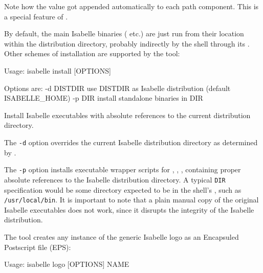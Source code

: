 \begin{isabellebody}
\begin{isamarkuptext}
  Note how the \hyperlink{setting.ML-IDENTIFIER}{\mbox{}} value got appended
  automatically to each path component. This is a special feature of
  \hyperlink{setting.ISABELLE-OUTPUT}{\mbox{}}.%
\end{isamarkuptext}%
\isamarkuptrue%
%
\isamarkuptrue%
%
\begin{isamarkuptext}%
By default, the main Isabelle binaries (\hyperlink{executable.isabelle}{\mbox{}} etc.)  are just run from their location within the
  distribution directory, probably indirectly by the shell through its
  \hyperlink{setting.PATH}{\mbox{}}.  Other schemes of installation are supported by the
  \hypertarget{tool.install}{\hyperlink{tool.install}{\mbox{}}} tool:
\begin{ttbox}
Usage: isabelle install [OPTIONS]

  Options are:
    -d DISTDIR   use DISTDIR as Isabelle distribution
                 (default ISABELLE_HOME)
    -p DIR       install standalone binaries in DIR

  Install Isabelle executables with absolute references to the current
  distribution directory.
\end{ttbox}

  The \verb|-d| option overrides the current Isabelle
  distribution directory as determined by \hyperlink{setting.ISABELLE-HOME}{\mbox{}}.

  The \verb|-p| option installs executable wrapper scripts for
  \hyperlink{executable.isabelle-process}{\mbox{}}, \hyperlink{executable.isabelle}{\mbox{}},
  \hyperlink{executable.Isabelle}{\mbox{}}, containing proper absolute references to the
  Isabelle distribution directory.  A typical \verb|DIR|
  specification would be some directory expected to be in the shell's
  \hyperlink{setting.PATH}{\mbox{}}, such as \verb|/usr/local/bin|.  It is
  important to note that a plain manual copy of the original Isabelle
  executables does not work, since it disrupts the integrity of the
  Isabelle distribution.%
\end{isamarkuptext}%
\isamarkuptrue%
%
\isamarkuptrue%
%
\begin{isamarkuptext}%
The \hypertarget{tool.logo}{\hyperlink{tool.logo}{\mbox{}}} tool creates any instance of the generic
  Isabelle logo as an Encapsuled Postscript file (EPS):
\begin{ttbox}
Usage: isabelle logo [OPTIONS] NAME


\end{ttbox}
\end{isamarkuptext}
\end{isabellebody}
